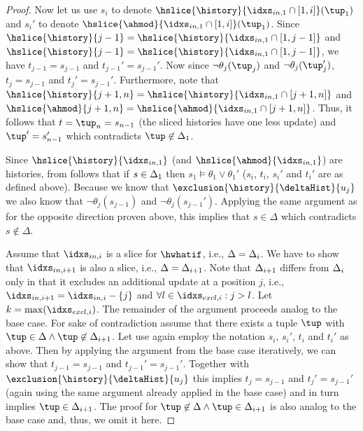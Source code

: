 {\begin{proof}
Now let us use $s_i$ to denote $\hslice{\history}{\iini{1} \cap [1,i]}(\tup_1)$ and $s_i'$ to denote $\hslice{\ahmod}{\iini{1} \cap [1,i]}(\tup_1)$.
Since $\hslice{\history}{j-1} = \hslice{\history}{\iini{1} \cap [1,j-1]}$ and $\hslice{\history}{j-1} = \hslice{\history}{\iini{1} \cap [1,j-1]}$, we have $t_{j-1} = s_{j-1}$ and $t_{j-1}' = s_{j-1}'$. Now since $\neg \theta_j(\tup_j)$ and $\neg \theta_j(\tup_{j}')$, $t_j = s_{j-1}$ and $t_j' = s_{j-1}'$. Furthermore, note that $\hslice{\history}{j+1,n} = \hslice{\history}{\iini{1} \cap [j+1,n]}$ and $\hslice{\ahmod}{j+1,n} = \hslice{\ahmod}{\iini{1} \cap [j+1,n]}$. Thus, it follows that $t = \tup_n = s_{n-1}$ (the sliced histories have one less update) and $\tup' = s_{n-1}'$ which contradicts $\tup \not\in \dslicei{1}$.

Since $\hslice{\history}{\iini{1}}$ (and $\hslice{\ahmod}{\iini{1}}$) are histories, from  follows that if $s \in \Delta_{1}$ then $s_1 \models \theta_1 \vee \theta_1'$ ($s_i$, $t_i$, $s_i'$ and $t_i'$ are as defined above). Because we know that $\exclusion{\history}{\deltaHist}{u_j}$ we also know that $\neg \theta_j(s_{j-1})$ and $\neg \theta_j(s_{j-1}')$. Applying the same argument as for the opposite direction proven above, this implies that $s \in \Delta$ which contradicts $s \not \in \Delta$.

Assume that $\iini{i}$ is a slice for $\hwhatif$, i.e., $\Delta = \Delta_{i}$. We have to show that $\iini{i+1}$ is also a slice, i.e., $\Delta = \Delta_{i+1}$. Note that $\Delta_{i+1}$ differs from $\Delta_{i}$ only in that it excludes an additional update at a position $j$, i.e., $\iini{i+1} = \iini{i} - \{ j \}$ and $\forall l \in \iexi{i}: j > l$. Let $k = \max(\iexi{i})$. The remainder of the argument proceeds analog to the base case. For sake of contradiction assume that there exists a tuple $\tup$ with $\tup \in \Delta \land \tup \not\in \dslicei{i+1}$. Let use again employ the notation $s_i$, $s_i'$, $t_i$ and $t_i'$ as above. Then by applying the argument from the base case iteratively, we can show that $t_{j-1} = s_{j-1}$ and $t_{j-1}'= s_{j-1}'$. Together with $\exclusion{\history}{\deltaHist}{u_j}$ this implies $t_j = s_{j-1}$ and $t_{j}' = s_{j-1}'$ (again using the same argument already applied in the base case) and in turn implies $\tup \in \dslicei{i+1}$. The proof for $\tup \not\in \Delta \land \tup \in \dslicei{i+1}$ is also analog to the base case and, thus, we omit it here.


\end{proof}}
